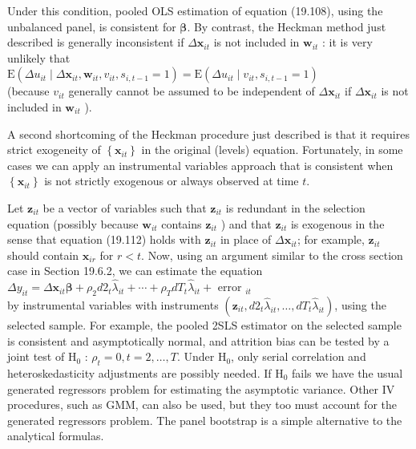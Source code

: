 \documentclass[10pt]{article}
\begin{document}
Under this condition, pooled OLS estimation of equation (19.108), using the unbalanced panel, is consistent for $\boldsymbol{\beta}$. By contrast, the Heckman method just described is generally inconsistent if $\Delta \mathbf{x}_{i t}$ is not included in $\mathbf{w}_{i t}$ : it is very unlikely that\\
$\mathrm{E}\left(\Delta u_{i t} \mid \Delta \mathbf{x}_{i t}, \mathbf{w}_{i t}, v_{i t}, s_{i, t-1}=1\right)=\mathrm{E}\left(\Delta u_{i t} \mid v_{i t}, s_{i, t-1}=1\right)$\\
(because $v_{i t}$ generally cannot be assumed to be independent of $\Delta \mathbf{x}_{i t}$ if $\Delta \mathbf{x}_{i t}$ is not included in $\mathbf{w}_{i t}$ ).

A second shortcoming of the Heckman procedure just described is that it requires strict exogeneity of $\left\{\mathbf{x}_{i t}\right\}$ in the original (levels) equation. Fortunately, in some cases we can apply an instrumental variables approach that is consistent when $\left\{\mathbf{x}_{i t}\right\}$ is not strictly exogenous or always observed at time $t$.

Let $\mathbf{z}_{i t}$ be a vector of variables such that $\mathbf{z}_{i t}$ is redundant in the selection equation (possibly because $\mathbf{w}_{i t}$ contains $\mathbf{z}_{i t}$ ) and that $\mathbf{z}_{i t}$ is exogenous in the sense that equation (19.112) holds with $\mathbf{z}_{i t}$ in place of $\Delta \mathbf{x}_{i t}$; for example, $\mathbf{z}_{i t}$ should contain $\mathbf{x}_{i r}$ for $r<t$. Now, using an argument similar to the cross section case in Section 19.6.2, we can estimate the equation\\
$\Delta y_{i t}=\Delta \mathbf{x}_{i t} \boldsymbol{\beta}+\rho_{2} d 2_{t} \hat{\lambda}_{i t}+\cdots+\rho_{T} d T_{t} \hat{\lambda}_{i t}+$ error $_{i t}$\\
by instrumental variables with instruments $\left(\mathbf{z}_{i t}, d 2_{t} \hat{\lambda}_{i t}, \ldots, d T_{t} \hat{\lambda}_{i t}\right)$, using the selected sample. For example, the pooled 2SLS estimator on the selected sample is consistent and asymptotically normal, and attrition bias can be tested by a joint test of $\mathrm{H}_{0}$ : $\rho_{t}=0, t=2, \ldots, T$. Under $\mathrm{H}_{0}$, only serial correlation and heteroskedasticity adjustments are possibly needed. If $\mathrm{H}_{0}$ fails we have the usual generated regressors problem for estimating the asymptotic variance. Other IV procedures, such as GMM, can also be used, but they too must account for the generated regressors problem. The panel bootstrap is a simple alternative to the analytical formulas.
\end{document}
